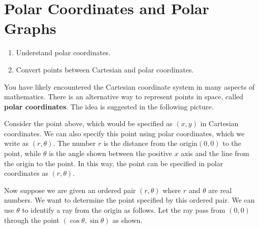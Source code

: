 \section{Polar Coordinates and Polar Graphs}

\begin{outcome}
\begin{enumerate}
\item[A.]  Understand polar coordinates.

\item[B.]  Convert points between Cartesian and polar coordinates. 
\end{enumerate}
\end{outcome}

You have likely encountered the Cartesian coordinate system in many aspects of mathematics. There is an alternative way to represent points in space, called \textbf{polar
coordinates}.
 The idea is suggested in the following picture.

\begin{center}
\end{center}

Consider the point above, which would be specified as $(x,y)$ in Cartesian coordinates. We can also specify this point using polar coordinates, which we write as $\left( r, \theta \right)$. The number $r$ is the distance from the origin$\left( 0,0\right)$ to the point, while $\theta $ is the angle shown
between the positive $x$ axis and the line from the origin to the point. In this way, the point can be specified in polar coordinates as $\left(r, \theta \right)$.

Now suppose we are given an ordered pair $\left( r,\theta \right) $ where 
$r$ and $\theta$ are real numbers. We want to determine the point specified by this ordered pair. We can use $\theta $ to identify a ray
from the origin as follows. Let the ray pass from $\left( 0,0\right) $
through the point $\left( \cos \theta ,\sin \theta \right) $ as shown.

\begin{center}
\end{center}

